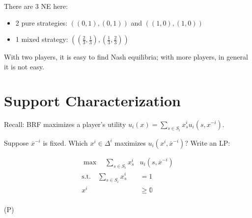 \documentclass[12pt,letterpaper]{report}
\begin{document}
\begin{ex}
\begin{center}
  \end{center}

  There are 3 NE here:
  \begin{itemize}
    \item 2 pure strategies: $((0, 1), (0, 1))$ and $((1, 0), (1, 0))$
    \item 1 mixed strategy: $((\frac{2}{3}, \frac{1}{3}), (\frac{1}{3}, \frac{2}{3}))$
  \end{itemize}
\end{ex}

With two players, it is easy to find Nash equilibria; with more players, in general it is not easy.

\section{Support Characterization}

Recall: BRF maximizes a player's utility $u_i(x) = \sum\limits_{s \in S_i} x_s^i u_i(s, x^{-i})$.

Suppose $\overline{x}^{-i}$ is fixed.
Which $x^i \in \Delta^i$ maximizes $u_i(x^i, \overline{x}^{-i})$?
Write an LP:

\begin{minipage}{0.9\textwidth}
  \begin{align*}
    \max \quad \sum_{s \in S_i} x_s^i &u_i(s, \overline{x}^{-i}) \\
    \text{s.t.} \quad \sum_{s \in S_i} x_s^i &= 1 \\
    x^i &\geq \mathbb{0} \\
  \end{align*}
\end{minipage}\hfill\begin{minipage}{0.05\textwidth}
  (P)
\end{minipage}
\end{document}
